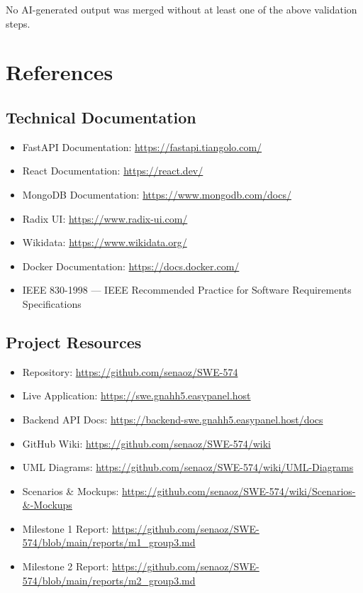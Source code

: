 \documentclass[11pt,a4paper]{report}
\begin{document}
No AI-generated output was merged without at least one of the above validation steps.

\chapter{References}

\section{Technical Documentation}

\begin{itemize}
    \item FastAPI Documentation: \url{https://fastapi.tiangolo.com/}
    \item React Documentation: \url{https://react.dev/}
    \item MongoDB Documentation: \url{https://www.mongodb.com/docs/}
    \item Radix UI: \url{https://www.radix-ui.com/}
    \item Wikidata: \url{https://www.wikidata.org/}
    \item Docker Documentation: \url{https://docs.docker.com/}
    \item IEEE 830-1998 --- IEEE Recommended Practice for Software Requirements Specifications
\end{itemize}

\section{Project Resources}

\begin{itemize}
    \item Repository: \url{https://github.com/senaoz/SWE-574}
    \item Live Application: \url{https://swe.gnahh5.easypanel.host}
    \item Backend API Docs: \url{https://backend-swe.gnahh5.easypanel.host/docs}
    \item GitHub Wiki: \url{https://github.com/senaoz/SWE-574/wiki}
    \item UML Diagrams: \url{https://github.com/senaoz/SWE-574/wiki/UML-Diagrams}
    \item Scenarios \& Mockups: \url{https://github.com/senaoz/SWE-574/wiki/Scenarios-\&-Mockups}
    \item Milestone 1 Report: \url{https://github.com/senaoz/SWE-574/blob/main/reports/m1\_group3.md}
    \item Milestone 2 Report: \url{https://github.com/senaoz/SWE-574/blob/main/reports/m2\_group3.md}
\end{itemize}
\end{document}
